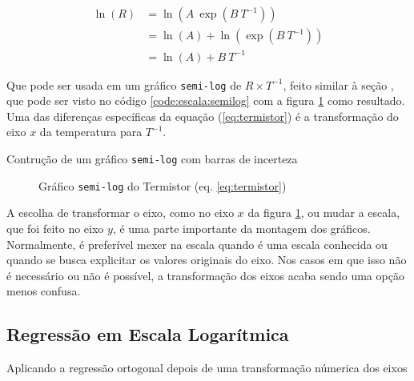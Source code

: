     \begin{align*}
        \ln(R)
            &= \ln\left(A ~ \exp\left(B ~ T^{-1}\right) \right) \\
            &= \ln(A) + \ln\left(\exp\left(B ~ T^{-1}\right) \right) \\
            &= \ln(A) + B ~ T^{-1}
    \end{align*}

    Que pode ser usada em um gráfico \texttt{semi-log} de $R \times T^{-1}$, feito similar à seção , que pode ser visto no código \ref{code:escala:semilog} com a figura \ref{fig:escala:semilog:resultado} como resultado. Uma das diferenças específicas da equação (\ref{eq:termistor}) é a transformação do eixo $x$ da temperatura para $T^{-1}$.

    \begin{listing}[H]
        \caption{Contrução de um gráfico \texttt{semi-log} com barras de incerteza}
        \label{code:escala:semilog}

    \end{listing}

    \begin{figure}[H]
        \centering
        

        \caption{Gráfico \texttt{semi-log} do Termistor (eq. \ref{eq:termistor})}
        \label{fig:escala:semilog:resultado}
    \end{figure}

    \begin{nota}
        A escolha de transformar o eixo, como no eixo $x$ da figura \ref{fig:escala:semilog:resultado}, ou mudar a escala, que foi feito no eixo $y$, é uma parte importante da montagem dos gráficos. Normalmente, é preferível mexer na escala quando é uma escala conhecida ou quando se busca explicitar os valores originais do eixo. Nos casos em que isso não é necessário ou não é possível, a transformação dos eixos acaba sendo uma opção menos confusa.
    \end{nota}


\subsection{Regressão em Escala Logarítmica} \label{sec:escala:regres}

    \begin{listing}[H]
        \caption{Aplicando a regressão ortogonal depois de uma transformação númerica dos eixos}
        \label{code:escala:regres}

    \end{listing}

